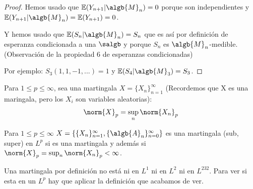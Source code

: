 \documentclass{apuntes}
\begin{document}
\begin{example}
\begin{enumerate}
\begin{proof}
Hemos usado que $\mathbb{E}(Y_{n+1}|\algb{M}_n)=0$ porque son independientes y $\mathbb{E}(Y_{n+1}|\algb{M}_n)=\mathbb{E}(Y_{n+1})=0$.

Y hemos usado que $\mathbb{E}(S_{n}|\algb{M}_n)=S_n$ que es así por definición de esperanza condicionada a una $\salgb$ y porque $S_n$ es $\algb{M}_n$-medible. (Observación de la propiedad 6 de esperanzas condicionadas)





Por ejemplo: $S_3(1,1,-1,...)=1$ y $\mathbb{E}(S_4|\algb{M}_3)=S_3$.

\end{proof}
\end{enumerate}
\end{example}

\begin{defn}
Para $1 \leq p \leq \infty$, sea una martingala $X=\{X_n\}_{n=1}^{\infty}$ (Recordemos que X es una maringala, pero los $X_i$ son variables aleatorias):
\[
\norm{X}_p = \sup_n \norm{X_n}_p
\]
\end{defn}

\begin{defn}[martingala en $L^p$]
Para $1 \leq p \leq \infty$ $X=\{\{X_n\}_{n=1}^{\infty}, \{\algb{A}_n\}_{n=0}^{\infty}\}$ es una martingala (sub, super) en $L^p$ si es una martingala y además si $\norm{X}_p = \sup_n \norm{X_n}_p < \infty$. 
\end{defn}

\obs Una martingala por definición no está ni en $L^1$ ni en $L^2$ ni en $L^232$. Para ver si esta en un $L^p$ hay que aplicar la definición que acabamos de ver.  
\end{document}
